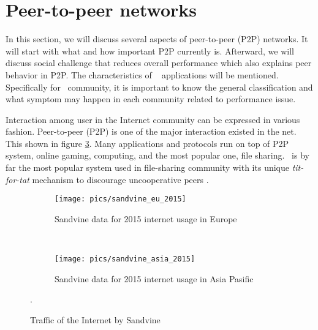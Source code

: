 %


\section{Peer-to-peer networks}
In this section, we will discuss several aspects of peer-to-peer (P2P) networks. It will start with what and how important P2P currently is. Afterward, we will discuss social challenge that reduces overall performance which also explains peer behavior in P2P. The characteristics of \bt~ applications will be mentioned. Specifically for \bt~community, it is important to know the general classification and what symptom may happen in each community related to performance issue. 

Interaction among user in the Internet community can be expressed in various fashion. Peer-to-peer (P2P) is one of the major interaction existed in the net. This shown in figure \ref{fig:usage}. Many applications and protocols run on top of P2P system, online gaming, computing, and the most popular one, file sharing. \bt~is by far the most popular system used in file-sharing community with its unique \textit{tit-for-tat} mechanism to discourage uncooperative peers \cite{2003:bittorrent:cohen}. 

\begin{figure}[h]
	\centering
	\begin{subfigure}[b]{0.8\textwidth}
		\texttt{[image: pics/sandvine\_eu\_2015]}
		\caption{Sandvine data for 2015 internet usage in Europe}
		\label{fig:usage1}
	\end{subfigure}\\
		\begin{subfigure}[b]{0.8\textwidth}
			\texttt{[image: pics/sandvine\_asia\_2015]}
			\caption{Sandvine data for 2015 internet usage in Asia Pasific}
			\label{fig:usage2}
		\end{subfigure}%
	\caption{Traffic of the Internet by Sandvine \cite{2015:internettraffic:sandvine}}.
	\label{fig:usage}
\end{figure}

